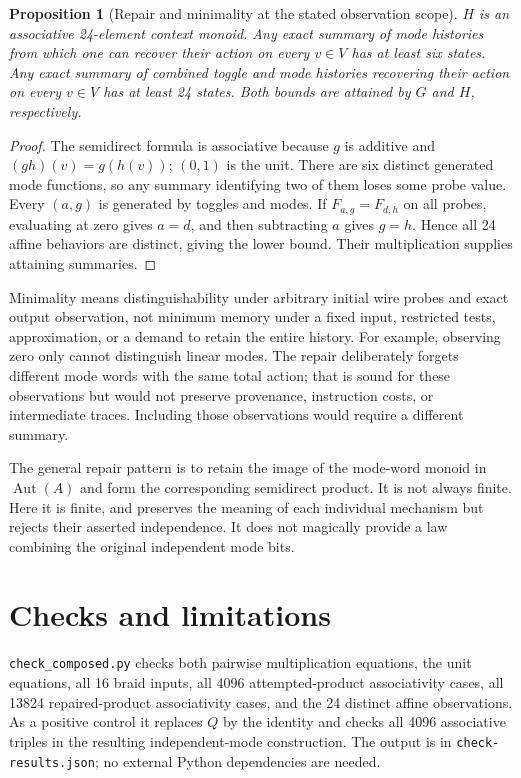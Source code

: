 \documentclass[11pt]{article}
\newtheorem{proposition}{Proposition}
\begin{document}
\begin{proposition}[Repair and minimality at the stated observation scope]
$H$ is an associative 24-element context monoid. Any exact summary of mode
histories from which one can recover their action on every $v\in V$ has
at least six states. Any exact summary of combined toggle and mode histories
recovering their action on every $v\in V$ has at least 24 states. Both bounds
are attained by $G$ and $H$, respectively.
\end{proposition}
\begin{proof}
The semidirect formula is associative because $g$ is additive and
$(gh)(v)=g(h(v))$; $(0,1)$ is the unit. There are six distinct generated
mode functions, so any summary identifying two of them loses some probe
value. Every $(a,g)$ is generated by toggles and modes. If
$F_{a,g}=F_{d,h}$ on all probes, evaluating at zero gives $a=d$, and then
subtracting $a$ gives $g=h$. Hence all 24 affine behaviors are distinct,
giving the lower bound. Their multiplication supplies attaining summaries.
\end{proof}

Minimality means distinguishability under arbitrary initial wire probes
and exact output observation, not minimum memory under a fixed input,
restricted tests, approximation, or a demand to retain the entire history.
For example, observing zero only cannot distinguish linear modes. The
repair deliberately forgets different mode words with the same total action;
that is sound for these observations but would not preserve provenance,
instruction costs, or intermediate traces. Including those observations
would require a different summary.

The general repair pattern is to retain the image of the mode-word monoid
in $\operatorname{Aut}(A)$ and form the corresponding semidirect product.
It is not always finite. Here it is finite, and preserves the meaning of
each individual mechanism but rejects their asserted independence. It does
not magically provide a law combining the original independent mode bits.

\section{Checks and limitations}
\texttt{check\_composed.py} checks both pairwise multiplication equations,
the unit equations, all 16 braid inputs, all 4096 attempted-product
associativity cases, all 13824 repaired-product associativity cases, and the
24 distinct affine observations. As a positive control it replaces $Q$ by
the identity and checks all 4096 associative triples in the resulting
independent-mode construction. The output is in
\texttt{check-results.json}; no external Python dependencies are needed.
\end{document}
